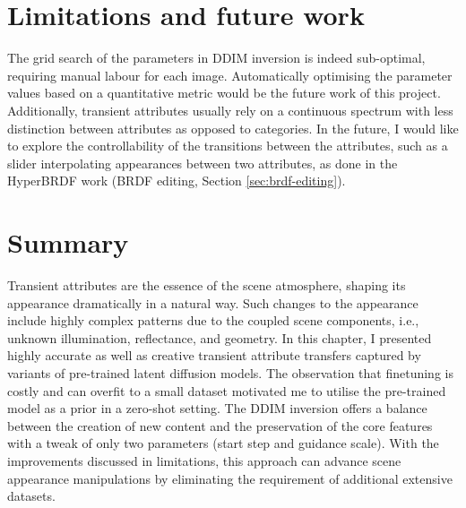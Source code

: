 









\section{Limitations and future work}
The grid search of the parameters in DDIM inversion is indeed sub-optimal, requiring manual labour for each image. Automatically optimising the parameter values based on a quantitative metric would be the future work of this project. Additionally, transient attributes usually rely on a continuous spectrum with less distinction between attributes as opposed to categories. In the future, I would like to explore the controllability of the transitions between the attributes, such as a slider interpolating appearances between two attributes, as done in the HyperBRDF work (BRDF editing, Section \ref{sec:brdf-editing}).

\section{Summary}

Transient attributes are the essence of the scene atmosphere, shaping its appearance dramatically in a natural way. Such changes to the appearance include highly complex patterns due to the coupled scene components, i.e., unknown illumination, reflectance, and geometry. In this chapter, I presented highly accurate as well as creative transient attribute transfers captured by variants of pre-trained latent diffusion models. The observation that finetuning is costly and can overfit to a small dataset motivated me to utilise the pre-trained model as a prior in a zero-shot setting. The DDIM inversion offers a balance between the creation of new content and the preservation of the core features with a tweak of only two parameters (start step and guidance scale). With the improvements discussed  in limitations, this approach can advance scene appearance manipulations by eliminating the requirement of additional extensive datasets. 


